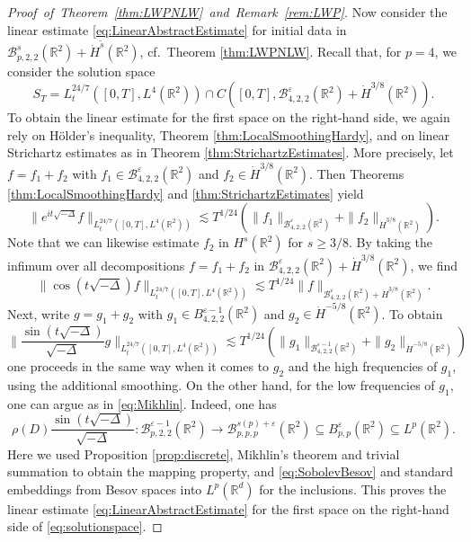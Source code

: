 \documentclass{amsart}
\theoremstyle{definition}
\newcommand{\R}{\mathbb{R}}
\newcommand {\Rd}{\mathbb{R}^{d}}
\newcommand {\Rtwo}{\mathbb{R}^{2}}
\newcommand {\Ba}{\mathcal{B}}
\newcommand {\veps}{\varepsilon}
\numberwithin{equation}{section}
\begin{document}
\begin{proof}[Proof~of~Theorem~\ref{thm:LWPNLW}~and~Remark~\ref{rem:LWP}]
Now consider the linear estimate \eqref{eq:LinearAbstractEstimate} for initial data in $\mathcal{B}^{s}_{p,2,2}(\R^2)+\dot{H}^{\tilde{s}}(\R^{2})$, cf.~Theorem \ref{thm:LWPNLW}. Recall that, for $p=4$, we consider the solution space
\begin{equation}\label{eq:solutionspace}
S_{T}=L^{24/7}_t([0,T],L^{4}(\Rtwo))\cap C([0,T],\Ba^{\veps}_{4,2,2}(\Rtwo)+\dot{H}^{3/8}(\Rtwo)).
\end{equation}
To obtain the linear estimate for the first space on the right-hand side, we again rely on H\"older's inequality, Theorem \ref{thm:LocalSmoothingHardy}, and on linear Strichartz estimates as in Theorem \ref{thm:StrichartzEstimates}. More precisely, let $f = f_1 + f_2$ with $f_1 \in \mathcal{B}^{\varepsilon}_{4,2,2}(\R^2)$ and $f_2 \in \dot{H}^{3/8}(\R^2)$. Then Theorems \ref{thm:LocalSmoothingHardy} and \ref{thm:StrichartzEstimates} yield
\begin{equation*}
\| e^{it \sqrt{-\Delta}} f \|_{L_t^{24/7}([0,T], L^4(\R^{2}))} \lesssim T^{1/24} (\| f_1 \|_{\mathcal{B}^{\varepsilon}_{4,2,2}(\R^2)} + \| f_2 \|_{\dot{H}^{3/8}(\R^2)}).
\end{equation*}
Note that we can likewise estimate $f_2$ in $H^s(\Rtwo)$ for $s \geq 3/8$. By taking the infimum over all decompositions $f = f_1+f_2$ in $\mathcal{B}^\varepsilon_{4,2,2}(\Rtwo) + \dot{H}^{3/8}(\Rtwo)$, we find
\begin{equation*}
\| \cos(t \sqrt{-\Delta}) f \|_{L_t^{24/7}([0,T], L^4(\R^{2}))} \lesssim T^{1/24} \| f \|_{\mathcal{B}^{\varepsilon}_{4,2,2}(\R^2) + \dot{H}^{3/8}(\R^2)}.
\end{equation*}
Next, write $g=g_{1}+g_{2}$ with $g_{1}\in B^{\veps-1}_{4,2,2}(\Rtwo)$ and $g_{2}\in \dot{H}^{-5/8}(\Rtwo)$. To obtain
\begin{equation*}
\Big\| \frac{\sin(t \sqrt{-\Delta})}{\sqrt{-\Delta}} g \Big\|_{L_t^{24/7}([0,T], L^4(\R^{2}))} \lesssim T^{1/24} (\| g_{1} \|_{\mathcal{B}^{\varepsilon-1}_{4,2,2}(\R^2)} + \|g_{2}\|_{\dot{H}^{-5/8}(\R^2)})
\end{equation*}
one proceeds in the same way when it comes to $g_{2}$ and the high frequencies of $g_{1}$, using the additional smoothing. On the other hand, for the low frequencies of $g_{1}$, one can argue as in \eqref{eq:Mikhlin}. Indeed, one has
\begin{equation}\label{eq:lowfreqadapted}
\rho(D) \frac{\sin (t \sqrt{- \Delta})}{\sqrt{- \Delta}}: \Ba^{\veps-1}_{p,2,2}(\R^{2}) \to\Ba^{s(p)+\veps}_{p,p,p}(\Rtwo)\subseteq B^{\veps}_{p,p}(\Rtwo)\subseteq L^p(\R^{2}).
\end{equation}
Here we used Proposition \ref{prop:discrete}, Mikhlin's theorem and trivial summation to obtain the mapping property, and \eqref{eq:SobolevBesov} and standard embeddings from Besov spaces into $L^{p}(\Rd)$ for the inclusions. This proves the linear estimate \eqref{eq:LinearAbstractEstimate} for the first space on the right-hand side of \eqref{eq:solutionspace}.


\end{proof}
\end{document}
